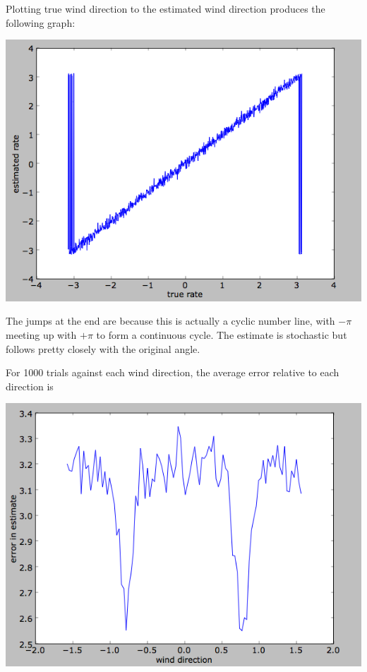 \documentclass[12pt]{article}
\begin{document}
Plotting true wind direction to the estimated wind direction produces the following graph:

\vspace{15pt}
\includegraphics[scale=0.5]{truevsestimated.png}
\vspace{5pt}

The jumps at the end are because this is actually a cyclic number line, with $-\pi$ meeting up with $+\pi$ to form a continuous cycle.  The estimate is stochastic but follows pretty closely with the original angle.

For 1000 trials against each wind direction, the average error relative to each direction is

\vspace{15pt}
\includegraphics[scale=0.5]{estimationerror.png}
\vspace{5pt}
\end{document}
